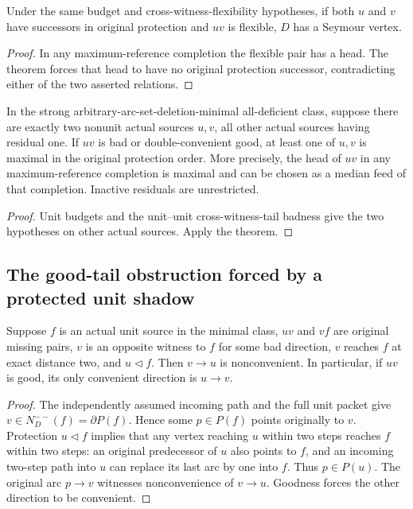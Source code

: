 \begin{corollary}
\label{cor:two-heavy-both-protection-successors}
Under the same budget and cross-witness-flexibility hypotheses,
if both $u$ and $v$ have successors in original protection and $uv$
is flexible, $D$ has a Seymour vertex.
\end{corollary}
\begin{proof}
In any maximum-reference completion the flexible pair has a head.
The theorem forces that head to have no original protection successor,
contradicting either of the two asserted relations.
\end{proof}

\begin{corollary}
\label{cor:two-heavy-minimal-flexible-reduction}
In the strong arbitrary-arc-set-deletion-minimal all-deficient class,
suppose there are exactly two nonunit actual sources $u,v$, all other
actual sources having residual one. If $uv$ is bad or double-convenient
good, at least one of $u,v$ is maximal in the original protection
order. More precisely, the head of $uv$ in any maximum-reference
completion is maximal and can be chosen as a median feed of that
completion. Inactive residuals are unrestricted.
\end{corollary}
\begin{proof}
Unit budgets and the unit--unit cross-witness-tail badness
give the two hypotheses on other actual sources. Apply the theorem.
\end{proof}

\subsection{The good-tail obstruction forced by a protected unit shadow}

\begin{lemma}
\label{lem:protected-unit-shadow-good-tail}
Suppose $f$ is an actual unit source in the minimal class, $uv$ and
$vf$ are original missing pairs, $v$ is an opposite witness to $f$
for some bad direction, $v$ reaches $f$ at exact distance two,
and $u\triangleleft f$. Then $v\to u$
is nonconvenient. In particular, if $uv$ is good, its only convenient
direction is $u\to v$.
\end{lemma}
\begin{proof}
The independently assumed incoming path and the full unit packet give
$v\in N_D^{--}(f)=\partial P(f)$. Hence some $p\in P(f)$ points
originally to $v$. Protection $u\triangleleft f$ implies that any
vertex reaching $u$ within two steps reaches $f$ within two steps:
an original predecessor of $u$ also points to $f$, and an incoming
two-step path into $u$ can replace its last arc by one into $f$.
Thus $p\in P(u)$. The original arc $p\to v$ witnesses nonconvenience
of $v\to u$. Goodness forces the other direction to be convenient.
\end{proof}

